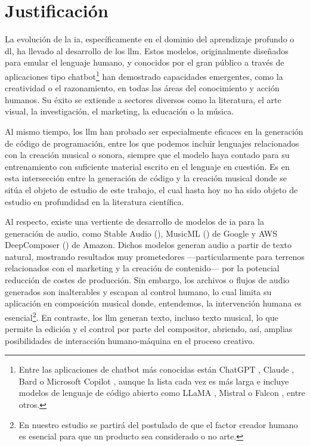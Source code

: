 \section{Justificación}



La evolución de la \gls{ia}, específicamente en el dominio del aprendizaje profundo o \gls{dl}, ha llevado al desarrollo de los \gls{llm}. Estos modelos, originalmente diseñados para emular el lenguaje humano, y conocidos por el gran público a través de aplicaciones tipo {chatbot}\footnote{Entre las aplicaciones de {chatbot} más conocidas están {ChatGPT} \citep{IntroducingChatGPT}, {Claude} \citep{IntroducingClaude}, {Bard} \citep{BardChatbot2024} o {Microsoft Copilot} \citep{mehdiAnnouncingMicrosoftCopilot2023}, aunque la lista cada vez es más larga e incluye modelos de lenguaje de código abierto como {LLaMA} \citep{touvronLLaMAOpenEfficient2023}, {Mistral} \citep{jiangMistral7B2023} o {Falcon} \citep{almazroueiFalconSeriesOpen2023}, entre otros.} han demostrado capacidades emergentes, como la creatividad o el razonamiento, en todas las áreas del conocimiento y acción humanos. Su éxito se extiende a sectores diversos como la literatura, el arte visual, la investigación, el marketing, la educación o la música. 

Al mismo tiempo, los \gls{llm} han probado ser especialmente eficaces en la generación de código de programación, entre los que podemos incluir lenguajes relacionados con la creación musical o sonora, siempre que el modelo haya contado para su entrenamiento con suficiente material escrito en el lenguaje en cuestión. Es en esta intersección entre la generación de código y la creación musical donde se sitúa el objeto de estudio de este trabajo, el cual hasta hoy no ha sido objeto de estudio en profundidad en la literatura científica.

Al respecto, existe una vertiente de desarrollo de modelos de \gls{ia} para la generación de audio, como {Stable Audio} (\citeyear{Audio}), {MusicML} (\citeyear{MusicLM}) de Google y {AWS DeepComposer} (\citeyear{AWSDeepComposer}) de Amazon. Dichos modelos generan audio a partir de texto natural, mostrando resultados muy prometedores ---particularmente para terrenos relacionados con el marketing y la creación de contenido--- por la potencial reducción de costes de producción. Sin embargo, los archivos o flujos de audio generados son inalterables y escapan al control humano, lo cual limita su aplicación en composición musical donde, entendemos, la intervención humana es esencial\footnote{En nuestro estudio se partirá del postulado de que el factor creador humano es esencial para que un producto sea considerado o no arte.}. En contraste, los \gls{llm} generan texto, incluso texto musical, lo que permite la edición y el control por parte del compositor, abriendo, así, amplias posibilidades de interacción humano-máquina en el proceso creativo.

